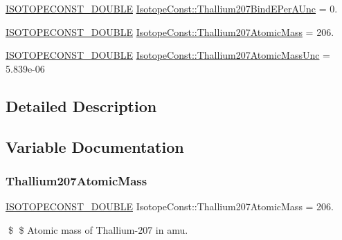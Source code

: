 \begin{DoxyCompactItemize}
\mbox{\hyperlink{group___isotope_const-_macros_ga8f45a7272ce02c0b4c65c44636ed719a}{I\+S\+O\+T\+O\+P\+E\+C\+O\+N\+S\+T\+\_\+\+D\+O\+U\+B\+LE}} \mbox{\hyperlink{group___isotope_const-_thallium-_tl207_ga01a70b515d53fbf098fef17df94c6438}{Isotope\+Const\+::\+Thallium207\+Bind\+E\+Per\+A\+Unc}} = 0.
\item 
\mbox{\hyperlink{group___isotope_const-_macros_ga8f45a7272ce02c0b4c65c44636ed719a}{I\+S\+O\+T\+O\+P\+E\+C\+O\+N\+S\+T\+\_\+\+D\+O\+U\+B\+LE}} \mbox{\hyperlink{group___isotope_const-_thallium-_tl207_ga183831ccac6839cdda8f03eec0a5271e}{Isotope\+Const\+::\+Thallium207\+Atomic\+Mass}} = 206.
\item 
\mbox{\hyperlink{group___isotope_const-_macros_ga8f45a7272ce02c0b4c65c44636ed719a}{I\+S\+O\+T\+O\+P\+E\+C\+O\+N\+S\+T\+\_\+\+D\+O\+U\+B\+LE}} \mbox{\hyperlink{group___isotope_const-_thallium-_tl207_gabcd42a90df20d4573c773196c11853ac}{Isotope\+Const\+::\+Thallium207\+Atomic\+Mass\+Unc}} = 5.\+839e-\/06
\end{DoxyCompactItemize}


\subsection{Detailed Description}


\subsection{Variable Documentation}
\mbox{\label{group___isotope_const-_thallium-_tl207_ga183831ccac6839cdda8f03eec0a5271e}} 
\subsubsection{\texorpdfstring{Thallium207\+Atomic\+Mass}{Thallium207AtomicMass}}
{\footnotesize\ttfamily \mbox{\hyperlink{group___isotope_const-_macros_ga8f45a7272ce02c0b4c65c44636ed719a}{I\+S\+O\+T\+O\+P\+E\+C\+O\+N\+S\+T\+\_\+\+D\+O\+U\+B\+LE}} Isotope\+Const\+::\+Thallium207\+Atomic\+Mass = 206.}

\$ \$ Atomic mass of Thallium-\/207 in amu. \mbox{\label{group___isotope_const-_thallium-_tl207_gabcd42a90df20d4573c773196c11853ac}} 
